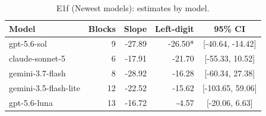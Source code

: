 \begin{table}[t]
\centering
\caption{E1f (Newest models): estimates by model.}
\label{tab:e1fmodel}
\small
\begin{tabular}{lrrrc}
\toprule
Model & Blocks & Slope & Left-digit & 95\% CI \\
\midrule
gpt-5.6-sol &  9 & -27.89 & -26.50* & [-40.64, -14.42] \\
claude-sonnet-5 &  6 & -17.91 & -21.70 & [-55.33, 10.52] \\
gemini-3.7-flash &  8 & -28.92 & -16.28 & [-60.34, 27.38] \\
gemini-3.5-flash-lite & 12 & -22.52 & -15.62 & [-103.65, 59.06] \\
gpt-5.6-luna & 13 & -16.72 & -4.57 & [-20.06, 6.63] \\
\bottomrule
\end{tabular}
\end{table}
